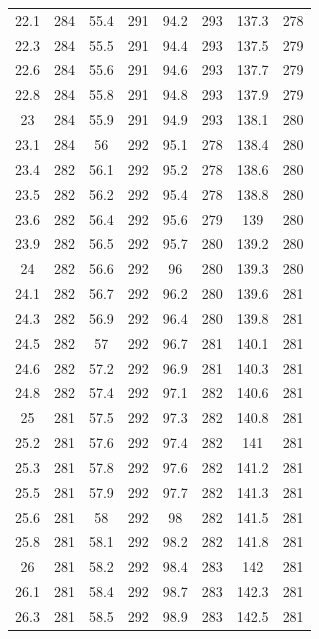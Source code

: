 \documentclass[12pt]{ctexart}
\numberwithin{equation}{section}
\begin{document}
\begin{longtable}{cc|cc|cc|cc}
22.1  &  284  &  55.4  &  291  &  94.2  &  293  &  137.3  &  278  \\
22.3  &  284  &  55.5  &  291  &  94.4  &  293  &  137.5  &  279  \\
22.6  &  284  &  55.6  &  291  &  94.6  &  293  &  137.7  &  279  \\
22.8  &  284  &  55.8  &  291  &  94.8  &  293  &  137.9  &  279  \\
23  &  284  &  55.9  &  291  &  94.9  &  293  &  138.1  &  280  \\
23.1  &  284  &  56  &  292  &  95.1  &  278  &  138.4  &  280  \\
23.4  &  282  &  56.1  &  292  &  95.2  &  278  &  138.6  &  280  \\
23.5  &  282  &  56.2  &  292  &  95.4  &  278  &  138.8  &  280  \\
23.6  &  282  &  56.4  &  292  &  95.6  &  279  &  139  &  280  \\
23.9  &  282  &  56.5  &  292  &  95.7  &  280  &  139.2  &  280  \\
24  &  282  &  56.6  &  292  &  96  &  280  &  139.3  &  280  \\
24.1  &  282  &  56.7  &  292  &  96.2  &  280  &  139.6  &  281  \\
24.3  &  282  &  56.9  &  292  &  96.4  &  280  &  139.8  &  281  \\
24.5  &  282  &  57  &  292  &  96.7  &  281  &  140.1  &  281  \\
24.6  &  282  &  57.2  &  292  &  96.9  &  281  &  140.3  &  281  \\
24.8  &  282  &  57.4  &  292  &  97.1  &  282  &  140.6  &  281  \\
25  &  281  &  57.5  &  292  &  97.3  &  282  &  140.8  &  281  \\
25.2  &  281  &  57.6  &  292  &  97.4  &  282  &  141  &  281  \\
25.3  &  281  &  57.8  &  292  &  97.6  &  282  &  141.2  &  281  \\
25.5  &  281  &  57.9  &  292  &  97.7  &  282  &  141.3  &  281  \\
25.6  &  281  &  58  &  292  &  98  &  282  &  141.5  &  281  \\
25.8  &  281  &  58.1  &  292  &  98.2  &  282  &  141.8  &  281  \\
26  &  281  &  58.2  &  292  &  98.4  &  283  &  142  &  281  \\
26.1  &  281  &  58.4  &  292  &  98.7  &  283  &  142.3  &  281  \\
26.3  &  281  &  58.5  &  292  &  98.9  &  283  &  142.5  &  281  \\

\end{longtable}
\end{document}
